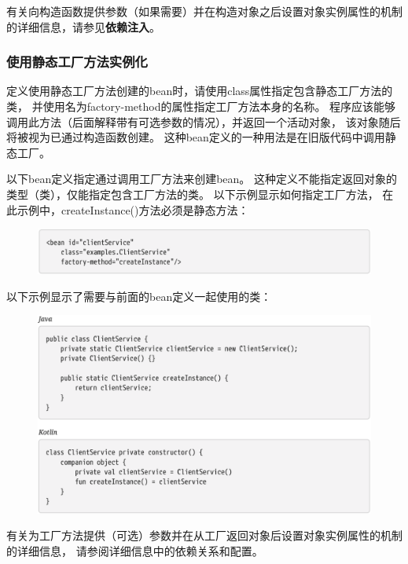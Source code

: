有关向构造函数提供参数（如果需要）并在构造对象之后设置对象实例属性的机制的详细信息，请参见\textbf{依赖注入}。

\subsubsection{使用静态工厂方法实例化}
定义使用静态工厂方法创建的bean时，请使用class属性指定包含静态工厂方法的类，
并使用名为factory-method的属性指定工厂方法本身的名称。 
程序应该能够调用此方法（后面解释带有可选参数的情况），并返回一个活动对象，
该对象随后将被视为已通过构造函数创建。 
这种bean定义的一种用法是在旧版代码中调用静态工厂。

以下bean定义指定通过调用工厂方法来创建bean。 
这种定义不能指定返回对象的类型（类），仅能指定包含工厂方法的类。  以下示例显示如何指定工厂方法，
在此示例中，createInstance()方法必须是静态方法：

\begin{figure}[ht]
    \centering
    \includegraphics[width=1\linewidth]{./Figure/IMG_code_15.png}
\end{figure}

\newpage
以下示例显示了需要与前面的bean定义一起使用的类：

\begin{figure}[ht]
    \centering
    \includegraphics[width=1\linewidth]{./Figure/IMG_code_16.png}
\end{figure}

有关为工厂方法提供（可选）参数并在从工厂返回对象后设置对象实例属性的机制的详细信息，
请参阅详细信息中的依赖关系和配置。

